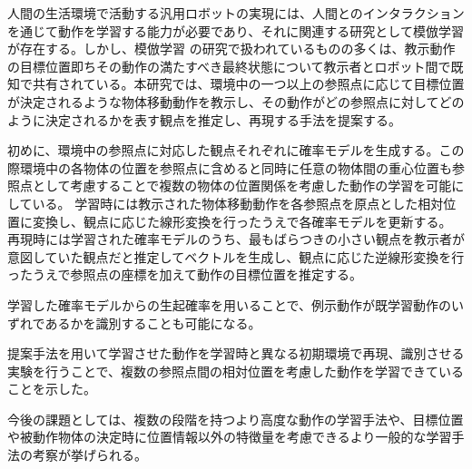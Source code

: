 ﻿人間の生活環境で活動する汎用ロボットの実現には、人間とのインタラクションを通じて動作を学習する能力が必要であり、それに関連する研究として模倣学習が存在する。しかし、模倣学習
の研究で扱われているものの多くは、教示動作の目標位置即ちその動作の満たすべき最終状態について教示者とロボット間で既知で共有されている。本研究では、環境中の一つ以上の参照点に応じて目標位置が決定されるような物体移動動作を教示し、その動作がどの参照点に対してどのように決定されるかを表す観点を推定し、再現する手法を提案する。

初めに、環境中の参照点に対応した観点それぞれに確率モデルを生成する。この際環境中の各物体の位置を参照点に含めると同時に任意の物体間の重心位置も参照点として考慮することで複数の物体の位置関係を考慮した動作の学習を可能にしている。
学習時には教示された物体移動動作を各参照点を原点とした相対位置に変換し、観点に応じた線形変換を行ったうえで各確率モデルを更新する。
再現時には学習された確率モデルのうち、最もばらつきの小さい観点を教示者が意図していた観点だと推定してベクトルを生成し、観点に応じた逆線形変換を行ったうえで参照点の座標を加えて動作の目標位置を推定する。

学習した確率モデルからの生起確率を用いることで、例示動作が既学習動作のいずれであるかを識別することも可能になる。

提案手法を用いて学習させた動作を学習時と異なる初期環境で再現、識別させる実験を行うことで、複数の参照点間の相対位置を考慮した動作を学習できていることを示した。

今後の課題としては、複数の段階を持つより高度な動作の学習手法や、目標位置や被動作物体の決定時に位置情報以外の特徴量を考慮できるより一般的な学習手法の考察が挙げられる。